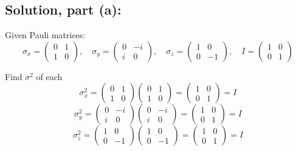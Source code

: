 \documentclass[12pt]{article}
\begin{document}
    \subsection{Solution, part (a):}
        Given Pauli matrices:
        \[
            \sigma_x = \begin{pmatrix} 0 & 1 \\ 1 & 0 \end{pmatrix}, \quad
            \sigma_y = \begin{pmatrix} 0 & -i \\ i & 0 \end{pmatrix}, \quad
            \sigma_z = \begin{pmatrix} 1 & 0 \\ 0 & -1 \end{pmatrix}, \quad
            I = \begin{pmatrix} 1 & 0 \\ 0 & 1 \end{pmatrix}
        \]
    
        Find $\sigma^2$ of each
        \[
            \sigma_x^2 = \begin{pmatrix} 0 & 1 \\ 1 & 0 \end{pmatrix} \begin{pmatrix} 0 & 1 \\ 1 & 0 \end{pmatrix} = \begin{pmatrix} 1 & 0 \\ 0 & 1 \end{pmatrix} = I
        \]
        \[
            \sigma_y^2 = \begin{pmatrix} 0 & -i \\ i & 0 \end{pmatrix} \begin{pmatrix} 0 & -i \\ i & 0 \end{pmatrix} = \begin{pmatrix} 1 & 0 \\ 0 & 1 \end{pmatrix} = I
        \]
        \[
            \sigma_z^2 = \begin{pmatrix} 1 & 0 \\ 0 & -1 \end{pmatrix} \begin{pmatrix} 1 & 0 \\ 0 & -1 \end{pmatrix} = \begin{pmatrix} 1 & 0 \\ 0 & 1 \end{pmatrix} = I
        \]
       
\end{document}
